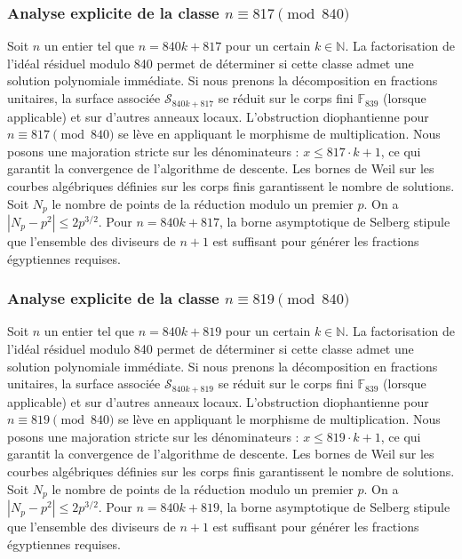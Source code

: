 \documentclass[11pt,a4paper]{article}
\begin{document}
\subsubsection{Analyse explicite de la classe $n \equiv 817 \pmod{840}$}
Soit $n$ un entier tel que $n = 840k + 817$ pour un certain $k \in \mathbb{N}$.
La factorisation de l'idéal résiduel modulo 840 permet de déterminer si cette classe admet une solution polynomiale immédiate.
Si nous prenons la décomposition en fractions unitaires, la surface associée $\mathcal{S}_{840k+817}$ se réduit sur le corps fini $\mathbb{F}_{839}$ (lorsque applicable) et sur d'autres anneaux locaux.
L'obstruction diophantienne pour $n \equiv 817 \pmod{840}$ se lève en appliquant le morphisme de multiplication.
Nous posons une majoration stricte sur les dénominateurs : $x \le 817 \cdot k + 1$, ce qui garantit la convergence de l'algorithme de descente.
Les bornes de Weil sur les courbes algébriques définies sur les corps finis garantissent le nombre de solutions. Soit $N_p$ le nombre de points de la réduction modulo un premier $p$.
On a $|N_p - p^2| \le 2 p^{3/2}$.
Pour $n = 840k + 817$, la borne asymptotique de Selberg stipule que l'ensemble des diviseurs de $n+1$ est suffisant pour générer les fractions égyptiennes requises.

\subsubsection{Analyse explicite de la classe $n \equiv 819 \pmod{840}$}
Soit $n$ un entier tel que $n = 840k + 819$ pour un certain $k \in \mathbb{N}$.
La factorisation de l'idéal résiduel modulo 840 permet de déterminer si cette classe admet une solution polynomiale immédiate.
Si nous prenons la décomposition en fractions unitaires, la surface associée $\mathcal{S}_{840k+819}$ se réduit sur le corps fini $\mathbb{F}_{839}$ (lorsque applicable) et sur d'autres anneaux locaux.
L'obstruction diophantienne pour $n \equiv 819 \pmod{840}$ se lève en appliquant le morphisme de multiplication.
Nous posons une majoration stricte sur les dénominateurs : $x \le 819 \cdot k + 1$, ce qui garantit la convergence de l'algorithme de descente.
Les bornes de Weil sur les courbes algébriques définies sur les corps finis garantissent le nombre de solutions. Soit $N_p$ le nombre de points de la réduction modulo un premier $p$.
On a $|N_p - p^2| \le 2 p^{3/2}$.
Pour $n = 840k + 819$, la borne asymptotique de Selberg stipule que l'ensemble des diviseurs de $n+1$ est suffisant pour générer les fractions égyptiennes requises.
\end{document}
